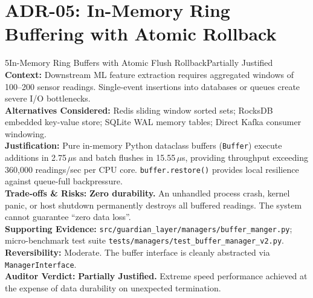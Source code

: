 \documentclass[10pt,a4paper]{report}
\begin{document}
\section{ADR-05: In-Memory Ring Buffering with Atomic Rollback}
\begin{adrbox}{5}{In-Memory Ring Buffers with Atomic Flush Rollback}{Partially Justified}
\textbf{Context:} Downstream ML feature extraction requires aggregated windows of 100--200 sensor readings. Single-event insertions into databases or queues create severe I/O bottlenecks.\\
\textbf{Alternatives Considered:} Redis sliding window sorted sets; RocksDB embedded key-value store; SQLite WAL memory tables; Direct Kafka consumer windowing.\\
\textbf{Justification:} Pure in-memory Python dataclass buffers (\texttt{Buffer}) execute additions in 2.75\,$\mu$s and batch flushes in 15.55\,$\mu$s, providing throughput exceeding 360,000 readings/sec per CPU core. \texttt{buffer.restore()} provides local resilience against queue-full backpressure.\\
\textbf{Trade-offs \& Risks:} \textbf{Zero durability.} An unhandled process crash, kernel panic, or host shutdown permanently destroys all buffered readings. The system cannot guarantee ``zero data loss''.\\
\textbf{Supporting Evidence:} \texttt{src/guardian\_layer/managers/buffer\_manger.py}; micro-benchmark test suite \texttt{tests/managers/test\_buffer\_manager\_v2.py}.\\
\textbf{Reversibility:} Moderate. The buffer interface is cleanly abstracted via \texttt{ManagerInterface}.\\
\textbf{Auditor Verdict:} \textbf{Partially Justified.} Extreme speed performance achieved at the expense of data durability on unexpected termination.
\end{adrbox}
\end{document}
